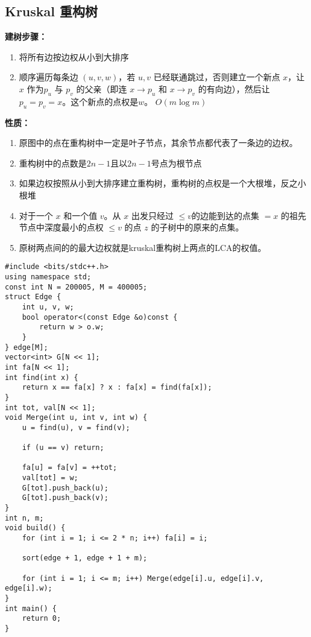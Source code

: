 \subsection{Kruskal 重构树}
\textbf{建树步骤：}

\begin{enumerate}
\item 将所有边按边权从小到大排序 
\item 顺序遍历每条边 $(u,v,w)$，若 $u,v$ 已经联通跳过，否则建立一个新点 $x$，让$x$ 作为$p_u$ 与 $p_v$ 的父亲（即连 $x\to p_u$ 和 $x\to p_v$ 的有向边），然后让 $p_u=p_v=x$。这个新点的点权是$w$。
   $O(m\log m)$
\end{enumerate}
\textbf{性质：}
\begin{enumerate}
\item 原图中的点在重构树中一定是叶子节点，其余节点都代表了一条边的边权。
\item 重构树中的点数是$2n-1$且以$2n-1$号点为根节点
\item 如果边权按照从小到大排序建立重构树，重构树的点权是一个大根堆，反之小根堆
\item 对于一个 $x$ 和一个值 $v$。从 $x$ 出发只经过 $≤v$的边能到达的点集 $= x$ 的祖先节点中深度最小的点权 $≤v$ 的点 $z$ 的子树中的原来的点集。
\item 原树两点间的的最大边权就是kruskal重构树上两点的LCA的权值。
\end{enumerate}
\begin{verbatim}
#include <bits/stdc++.h>
using namespace std;
const int N = 200005, M = 400005;
struct Edge {
    int u, v, w;
    bool operator<(const Edge &o)const {
        return w > o.w;
    }
} edge[M];
vector<int> G[N << 1];
int fa[N << 1];
int find(int x) {
    return x == fa[x] ? x : fa[x] = find(fa[x]);
}
int tot, val[N << 1];
void Merge(int u, int v, int w) {
    u = find(u), v = find(v);

    if (u == v) return;

    fa[u] = fa[v] = ++tot;
    val[tot] = w;
    G[tot].push_back(u);
    G[tot].push_back(v);
}
int n, m;
void build() {
    for (int i = 1; i <= 2 * n; i++) fa[i] = i;

    sort(edge + 1, edge + 1 + m);

    for (int i = 1; i <= m; i++) Merge(edge[i].u, edge[i].v, edge[i].w);
}
int main() {
    return 0;
}
\end{verbatim}